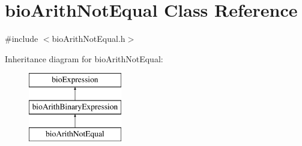 \hypertarget{classbio_arith_not_equal}{}\section{bio\+Arith\+Not\+Equal Class Reference}
\label{classbio_arith_not_equal}


{\ttfamily \#include $<$bio\+Arith\+Not\+Equal.\+h$>$}

Inheritance diagram for bio\+Arith\+Not\+Equal\+:\begin{figure}[H]
\begin{center}
\leavevmode
\includegraphics[height=3.000000cm]{classbio_arith_not_equal}
\end{center}
\end{figure}
